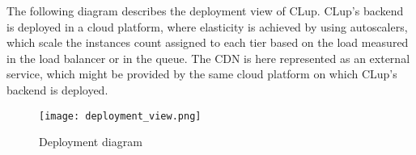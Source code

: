 \documentclass[../../main.tex]{subfiles}
\begin{document}
The following diagram describes the deployment view of CLup. CLup's backend is deployed in a cloud platform, where elasticity is 
achieved by using autoscalers, which scale the instances count assigned to each tier based on the load measured in the load balancer
or in the queue. The CDN is here represented as an external service, which might be provided by the same cloud platform on which 
CLup's backend is deployed.

\begin{figure}[H]
    \centering
    \texttt{[image: deployment\_view.png]}
    \caption{
        Deployment diagram
    }
\end{figure}
\end{document}
